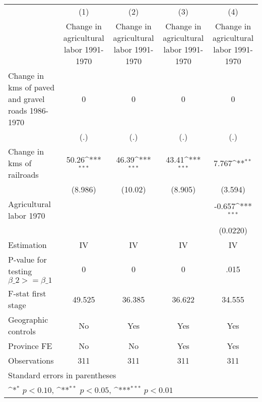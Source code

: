{
\def\sym#1{\ifmmode^{#1}\else\(^{#1}\)\fi}
\begin{tabular}{l*{4}{c}}
\hline\hline
                    &\multicolumn{1}{c}{(1)}&\multicolumn{1}{c}{(2)}&\multicolumn{1}{c}{(3)}&\multicolumn{1}{c}{(4)}\\
                    &\multicolumn{1}{c}{Change in agricultural labor 1991-1970}&\multicolumn{1}{c}{Change in agricultural labor 1991-1970}&\multicolumn{1}{c}{Change in agricultural labor 1991-1970}&\multicolumn{1}{c}{Change in agricultural labor 1991-1970}\\
\hline
Change in kms of paved and gravel roads 1986-1970&           0         &           0         &           0         &           0         \\
                    &         (.)         &         (.)         &         (.)         &         (.)         \\
[1em]
Change in kms of railroads&       50.26\sym{***}&       46.39\sym{***}&       43.41\sym{***}&       7.767\sym{**} \\
                    &     (8.986)         &     (10.02)         &     (8.905)         &     (3.594)         \\
[1em]
Agricultural labor 1970&                     &                     &                     &      -0.657\sym{***}\\
                    &                     &                     &                     &    (0.0220)         \\
\hline
Estimation          &          IV         &          IV         &          IV         &          IV         \\
P-value for testing $\beta\_2 >= \beta\_1$&           0         &           0         &           0         &        .015         \\
F-stat first stage  &      49.525         &      36.385         &      36.622         &      34.555         \\
Geographic controls &          No         &         Yes         &         Yes         &         Yes         \\
Province FE         &          No         &          No         &         Yes         &         Yes         \\
Observations        &         311         &         311         &         311         &         311         \\
\hline\hline
\multicolumn{5}{l}{\footnotesize Standard errors in parentheses}\\
\multicolumn{5}{l}{\footnotesize \sym{*} \(p<0.10\), \sym{**} \(p<0.05\), \sym{***} \(p<0.01\)}\\
\end{tabular}
}
